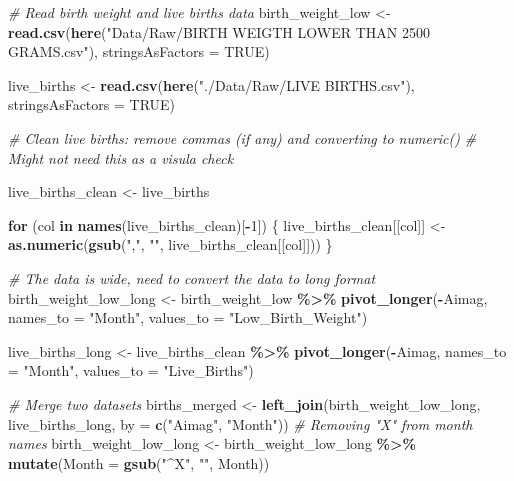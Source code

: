 \documentclass[
]{article}
\newenvironment{Shaded}{\begin{snugshade}}{\end{snugshade}}
\newcommand{\AttributeTok}[1]{\textcolor[rgb]{0.13,0.29,0.53}{#1}}
\newcommand{\CommentTok}[1]{\textcolor[rgb]{0.56,0.35,0.01}{\textit{#1}}}
\newcommand{\ConstantTok}[1]{\textcolor[rgb]{0.56,0.35,0.01}{#1}}
\newcommand{\ControlFlowTok}[1]{\textcolor[rgb]{0.13,0.29,0.53}{\textbf{#1}}}
\newcommand{\DecValTok}[1]{\textcolor[rgb]{0.00,0.00,0.81}{#1}}
\newcommand{\FunctionTok}[1]{\textcolor[rgb]{0.13,0.29,0.53}{\textbf{#1}}}
\newcommand{\NormalTok}[1]{#1}
\newcommand{\OtherTok}[1]{\textcolor[rgb]{0.56,0.35,0.01}{#1}}
\newcommand{\SpecialCharTok}[1]{\textcolor[rgb]{0.81,0.36,0.00}{\textbf{#1}}}
\newcommand{\StringTok}[1]{\textcolor[rgb]{0.31,0.60,0.02}{#1}}
\begin{document}
\begin{Shaded}
\begin{Highlighting}[]
\CommentTok{\# Read birth weight and live births data}
\NormalTok{birth\_weight\_low }\OtherTok{\textless{}{-}} \FunctionTok{read.csv}\NormalTok{(}\FunctionTok{here}\NormalTok{(}\StringTok{"Data/Raw/BIRTH WEIGTH LOWER THAN 2500 GRAMS.csv"}\NormalTok{), }\AttributeTok{stringsAsFactors =} \ConstantTok{TRUE}\NormalTok{)}

\NormalTok{live\_births }\OtherTok{\textless{}{-}} \FunctionTok{read.csv}\NormalTok{(}\FunctionTok{here}\NormalTok{(}\StringTok{"./Data/Raw/LIVE BIRTHS.csv"}\NormalTok{), }\AttributeTok{stringsAsFactors =} \ConstantTok{TRUE}\NormalTok{)}

\CommentTok{\# Clean live births: remove commas (if any) and converting to numeric()}
\CommentTok{\# Might not need this as a visula check}

\NormalTok{live\_births\_clean }\OtherTok{\textless{}{-}}\NormalTok{ live\_births}
 
 \ControlFlowTok{for}\NormalTok{ (col }\ControlFlowTok{in} \FunctionTok{names}\NormalTok{(live\_births\_clean)[}\SpecialCharTok{{-}}\DecValTok{1}\NormalTok{]) \{}
\NormalTok{   live\_births\_clean[[col]] }\OtherTok{\textless{}{-}} \FunctionTok{as.numeric}\NormalTok{(}\FunctionTok{gsub}\NormalTok{(}\StringTok{","}\NormalTok{, }\StringTok{""}\NormalTok{, live\_births\_clean[[col]]))}
\NormalTok{ \}}

\CommentTok{\# The data is wide, need to convert the data to long format}
\NormalTok{birth\_weight\_low\_long }\OtherTok{\textless{}{-}}\NormalTok{ birth\_weight\_low }\SpecialCharTok{\%\textgreater{}\%} 
  \FunctionTok{pivot\_longer}\NormalTok{(}\SpecialCharTok{{-}}\NormalTok{Aimag, }
               \AttributeTok{names\_to =} \StringTok{"Month"}\NormalTok{, }
               \AttributeTok{values\_to =} \StringTok{"Low\_Birth\_Weight"}\NormalTok{)}

\NormalTok{live\_births\_long }\OtherTok{\textless{}{-}}\NormalTok{ live\_births\_clean }\SpecialCharTok{\%\textgreater{}\%} 
  \FunctionTok{pivot\_longer}\NormalTok{(}\SpecialCharTok{{-}}\NormalTok{Aimag, }
               \AttributeTok{names\_to =} \StringTok{"Month"}\NormalTok{, }
               \AttributeTok{values\_to =} \StringTok{"Live\_Births"}\NormalTok{)}

\CommentTok{\# Merge two datasets}
\NormalTok{births\_merged }\OtherTok{\textless{}{-}} \FunctionTok{left\_join}\NormalTok{(birth\_weight\_low\_long,}
\NormalTok{                           live\_births\_long, }
                           \AttributeTok{by =} \FunctionTok{c}\NormalTok{(}\StringTok{"Aimag"}\NormalTok{, }\StringTok{"Month"}\NormalTok{))}
\CommentTok{\# Removing "X" from month names}
\NormalTok{birth\_weight\_low\_long }\OtherTok{\textless{}{-}}\NormalTok{ birth\_weight\_low\_long }\SpecialCharTok{\%\textgreater{}\%}
  \FunctionTok{mutate}\NormalTok{(}\AttributeTok{Month =} \FunctionTok{gsub}\NormalTok{(}\StringTok{"\^{}X"}\NormalTok{, }\StringTok{""}\NormalTok{, Month))}


\end{Highlighting}
\end{Shaded}
\end{document}
